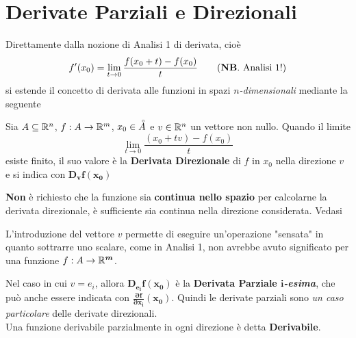 \section{Derivate Parziali e Direzionali}
Direttamente dalla nozione di Analisi 1 di derivata, cioè
\begin{align*}
	f'(x_0) = \lim\limits_{t \to 0} \frac{f(x_0 + t) - f(x_0)}{t} \tag{\textbf{NB}. Analisi 1!}
\end{align*}
si estende il concetto di derivata alle funzioni in spazi $n$\textit{-dimensionali} mediante la seguente
\begin{definition}
	\label{def:deriv_direz}
	Sia $A \subseteq \mathbb{R}^n$, $f: A \to \mathbb{R}^m$, $x_0 \in \accentset{\circ}{A}$ e $v \in \mathbb{R}^n$ un vettore non nullo. Quando il limite
	\[\lim\limits_{t \to 0} \frac{(x_0 + tv) - f(x_0)}{t}\]
	esiste finito, il suo valore è la \textbf{Derivata Direzionale} di $f$ in $x_0$ nella direzione $v$ e si indica con $\boldsymbol{D_v f(x_0)}$
	\begin{note}
		\textbf{Non} è richiesto che la funzione sia \textbf{continua nello spazio} per calcolarne la derivata direzionale, è sufficiente sia continua nella direzione considerata. Vedasi 
	\end{note}
	\begin{note}
		L'introduzione del vettore $v$ permette di eseguire un'operazione "sensata" in quanto sottrarre uno scalare, come in Analisi 1, non avrebbe avuto significato per una funzione $f: A \to \mathbb{R}^{\boldsymbol{m}}$.
	\end{note}

	Nel caso in cui $v = e_i$, allora $\boldsymbol{D_{e_i} f(x_0)}$ è la \textbf{Derivata Parziale $\boldsymbol{i}$\textit{-esima}}, che può anche essere indicata con $\boldsymbol{\frac{\partial f}{\partial x_i}(x_0)}$. Quindi le derivate parziali sono \textit{un caso particolare} delle derivate direzionali.\\

	\noindent Una funzione derivabile parzialmente in ogni direzione è detta \textbf{Derivabile}.


\end{definition}
